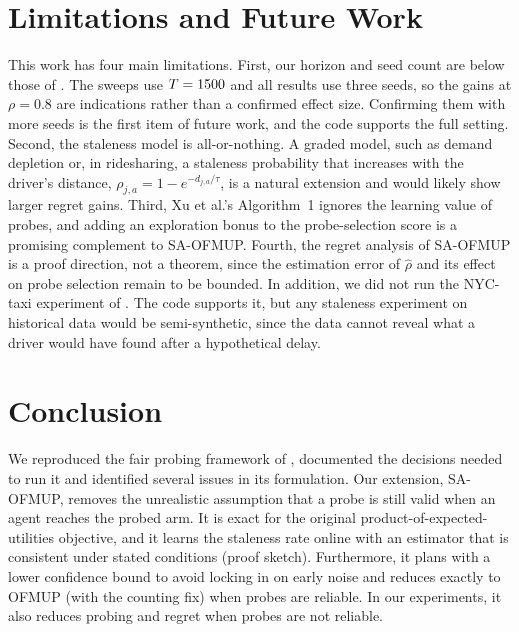 \documentclass[letterpaper]{article}
\newcommand{\rhat}{\hat{\rho}}
\begin{document}
\section{Limitations and Future Work}
\label{sec:limits}
This work has four main limitations. First, our horizon and seed count are
below those of \citet{xu2026fair}. The sweeps use $T=1500$ and all results use
three seeds, so the gains at $\rho=0.8$ are indications rather than a confirmed
effect size. Confirming them with more seeds is the first item of future work,
and the code supports the full setting. Second, the staleness model is
all-or-nothing. A graded model, such as demand depletion or, in ridesharing, a
staleness probability that increases with the driver's distance,
$\rho_{j,a}=1-e^{-d_{j,a}/\tau}$, is a natural extension and would likely show
larger regret gains. Third, Xu et al.'s Algorithm~1 ignores the learning value
of probes, and adding an exploration bonus to the probe-selection score is a
promising complement to SA-OFMUP. Fourth, the regret analysis of SA-OFMUP is a
proof direction, not a theorem, since the estimation error of $\rhat$ and its
effect on probe selection remain to be bounded. In addition, we did not run the
NYC-taxi experiment of \citet{xu2026fair}. The code supports it, but any
staleness experiment on historical data would be semi-synthetic, since the data
cannot reveal what a driver would have found after a hypothetical delay.

\section{Conclusion}
\label{sec:conclusion}
We reproduced the fair probing framework of \citet{xu2026fair}, documented the
decisions needed to run it and identified several issues in its formulation.
Our extension, SA-OFMUP, removes the unrealistic assumption that a probe is
still valid when an agent reaches the probed arm. It is exact for the original
product-of-expected-utilities objective, and it learns the staleness rate online
with an estimator that is consistent under stated conditions (proof sketch).
Furthermore, it plans with a lower confidence bound to avoid locking in on early
noise and reduces exactly to OFMUP (with the counting fix) when probes are
reliable. In our experiments, it also reduces probing and regret when probes
are not reliable.



\end{document}
